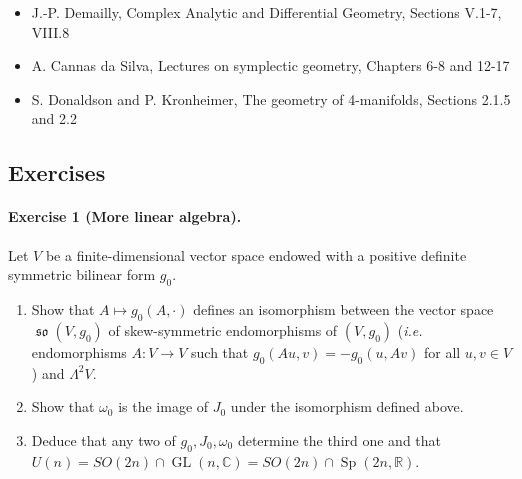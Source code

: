 \documentclass{article}
\theoremstyle{definition}
\DeclareMathOperator{\Sp}{Sp}
\DeclareMathOperator{\GL}{GL}
\DeclareMathOperator{\so}{\mathfrak{so}}
\newcommand{\R}{\mathbb{R}}
\newcommand{\C}{\mathbb{C}}
\begin{document}
\begin{itemize}
    \item J.-P. Demailly, Complex Analytic and Differential Geometry, Sections
        V.1-7, VIII.8

    \item A. Cannas da Silva, Lectures on symplectic geometry, Chapters 6-8 and
        12-17

    \item S. Donaldson and P. Kronheimer, The geometry of 4-manifolds, Sections
        2.1.5 and 2.2
\end{itemize}

\subsection*{Exercises}


\paragraph{Exercise 1 {\normalfont(More linear algebra)}.} Let $V$ be a
finite-dimensional vector space endowed with a positive definite symmetric
bilinear form $g_0$.
\begin{enumerate}[label=(\roman*)]
    \item Show that $A\mapsto g_0(A,\cdot)$ defines an isomorphism between the
        vector space $\so(V,g_0)$ of skew-symmetric endomorphisms of $(V,g_0)$
        (\emph{i.e.} endomorphisms $A:V\to V$ such that $g_0(Au,v)=-g_0(u,Av)$
        for all $u,v\in V$) and $\Lambda^2V$.

    \item Show that $\omega_0$ is the image of $J_0$ under the isomorphism
        defined above.

    \item Deduce that any two of $g_0,J_0,\omega_0$ determine the third one and
        that $U(n)=SO(2n)\cap\GL(n,\C)=SO(2n)\cap\Sp(2n,\R)$.
\end{enumerate}
\end{document}
